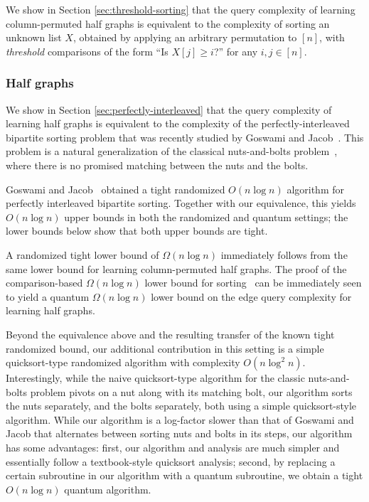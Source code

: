 \documentclass[11pt]{article}
\begin{document}
We show in Section \ref{sec:threshold-sorting}
that the query complexity of learning column-permuted half graphs is equivalent to the complexity of sorting an unknown list $X$, obtained by applying an arbitrary permutation to $[n]$, with \emph{threshold} comparisons of the form ``Is $X[j] \geq i$?'' for any $i, j \in [n]$.




\subsubsection{Half graphs}

We show in Section \ref{sec:perfectly-interleaved} that the query complexity of learning half graphs is equivalent to the complexity of the perfectly-interleaved bipartite sorting problem that was recently studied by Goswami and Jacob~\cite{GJarxiv, GJ24, GJapprox}. This problem is a natural generalization of the classical nuts-and-bolts problem~\cite{Raw92}, where there is no promised matching between the
nuts and the bolts.

Goswami and Jacob~\cite{GJarxiv, GJapprox} obtained a tight randomized $O(n \log n)$ algorithm for perfectly interleaved bipartite sorting. Together with our equivalence, this yields $O(n\log n)$ upper bounds in both the randomized and quantum settings; the lower bounds below show that both upper bounds are tight.

A randomized tight lower bound of $\Omega(n \log n)$ immediately follows from the same lower bound for learning column-permuted half graphs. 
The proof of the comparison-based $\Omega(n \log n)$ lower bound for sorting~\cite[Theorem~2]{HNS02} can be immediately seen to yield a quantum $\Omega(n \log n)$ lower bound on the edge query complexity for learning half graphs.

Beyond the equivalence above and the resulting transfer of the known tight randomized bound, our additional contribution in this setting is a simple quicksort-type randomized algorithm with complexity $O(n \log^2 n)$.
Interestingly, while the naive quicksort-type algorithm for the classic nuts-and-bolts problem pivots on a nut along with its matching bolt, our algorithm sorts the nuts separately, and the bolts separately, both using a simple quicksort-style algorithm. While our algorithm is a log-factor slower than that of Goswami and Jacob that alternates between sorting nuts and bolts in its steps, our algorithm has some advantages: first, our algorithm and analysis are much simpler and essentially follow a textbook-style quicksort analysis; second, by replacing a certain subroutine in our algorithm with a quantum subroutine, we obtain a tight $O(n \log n)$ quantum algorithm. 
\end{document}
